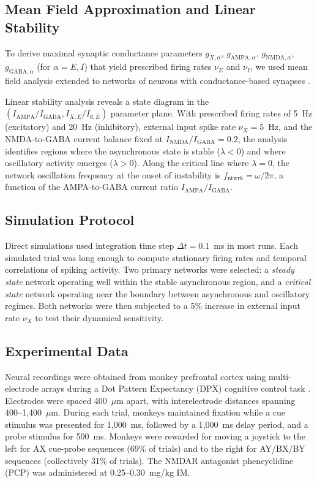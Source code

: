 \documentclass[10pt]{article}
\begin{document}
\subsection{Mean Field Approximation and Linear Stability}

To derive maximal synaptic conductance parameters $g_{X,\alpha}$,
$g_{\text{AMPA},\alpha}$, $g_{\text{NMDA},\alpha}$, $g_{\text{GABA},\alpha}$
(for $\alpha = E, I$) that yield prescribed firing rates $\nu_E$ and $\nu_I$,
we used mean field analysis \citep{amit1997model, brunel2000dynamics} extended
to networks of neurons with conductance-based synapses
\citep{brunel2001effects}.

Linear stability analysis reveals a state diagram in the
$(I_{\text{AMPA}}/I_{\text{GABA}}, I_{X,E}/I_{\theta,E})$ parameter plane.
With prescribed firing rates of 5~Hz (excitatory) and 20~Hz (inhibitory),
external input spike rate $\nu_X = 5$~Hz, and the NMDA-to-GABA current balance
fixed at $I_{\text{NMDA}}/I_{\text{GABA}} = 0.2$, the analysis identifies
regions where the asynchronous state is stable ($\lambda < 0$) and where
oscillatory activity emerges ($\lambda > 0$). Along the critical line where
$\lambda = 0$, the network oscillation frequency at the onset of instability
is $f_{\text{ntwrk}} = \omega / 2\pi$, a function of the AMPA-to-GABA current
ratio $I_{\text{AMPA}}/I_{\text{GABA}}$.

\subsection{Simulation Protocol}

Direct simulations used integration time step $\Delta t = 0.1$~ms in most
runs. Each simulated trial was long enough to compute stationary firing
rates and temporal correlations of spiking activity. Two primary networks were selected: a \emph{steady state} network
operating well within the stable asynchronous region, and a \emph{critical
state} network operating near the boundary between asynchronous and
oscillatory regimes. Both networks were then subjected to a 5\% increase in
external input rate $\nu_X$ to test their dynamical sensitivity.

\subsection{Experimental Data}

Neural recordings were obtained from monkey prefrontal cortex using
multi-electrode arrays during a Dot Pattern Expectancy (DPX) cognitive
control task \citep{zick2018blocking}. Electrodes were spaced 400~$\mu$m
apart, with interelectrode distances spanning 400--1{,}400~$\mu$m. During
each trial, monkeys maintained fixation while a cue stimulus was presented
for 1{,}000~ms, followed by a 1{,}000~ms delay period, and a probe stimulus
for 500~ms. Monkeys were rewarded for moving a joystick to the left for AX
cue-probe sequences (69\% of trials) and to the right for AY/BX/BY sequences
(collectively 31\% of trials). The NMDAR antagonist phencyclidine (PCP) was
administered at 0.25--0.30~mg/kg IM.
\end{document}
